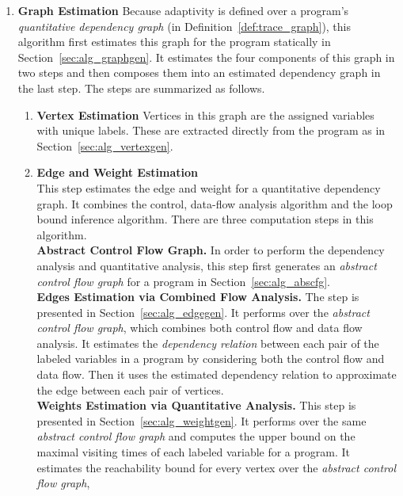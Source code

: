\begin{enumerate}
  \item \textbf{Graph Estimation}
  Because adaptivity is defined over a program's \emph{quantitative dependency graph} (in Definition~\ref{def:trace_graph}),
  this algorithm first estimates this graph for the program statically
  in Section~\ref{sec:alg_graphgen}.
  It estimates the four components of this graph in two steps and then composes them into an estimated dependency graph
  in the last step.
  The steps are summarized  as follows.
\begin{enumerate}
  \item \textbf{Vertex Estimation}
  Vertices in this graph are the assigned variables with unique labels. 
  These are extracted directly from the program as in Section~\ref{sec:alg_vertexgen}.
  \item \textbf{Edge and Weight Estimation}
  \\
  This step estimates the edge and weight for a quantitative dependency graph. It combines the control, data-flow  analysis algorithm and the loop bound inference algorithm.
  There are three computation steps in this algorithm.
  \\
  \textbf{Abstract Control Flow Graph.}
  In order to perform the dependency analysis and quantitative analysis, this step first generates an \emph{abstract control flow graph} for a program in Section~\ref{sec:alg_abscfg}.
  \\
  \textbf{Edges Estimation via Combined Flow Analysis.} 
  The step is presented in
  Section~\ref{sec:alg_edgegen}. It performs over the \emph{abstract control flow graph}, which combines both control flow and data flow analysis.
  It estimates the \emph{dependency relation} between each pair of the labeled variables in a program by considering both the control flow and data flow.
  Then it uses the estimated dependency relation to approximate the edge
  between each pair of vertices.
  \\
  \textbf{Weights Estimation via Quantitative Analysis.} 
  This step is presented in Section~\ref{sec:alg_weightgen}. 
  It performs over the same \emph{abstract control flow graph} and computes the upper bound on the maximal visiting times of each labeled variable for a program.
  It estimates the reachability bound for every vertex over the \emph{abstract control flow graph},

\end{enumerate}
\end{enumerate}
